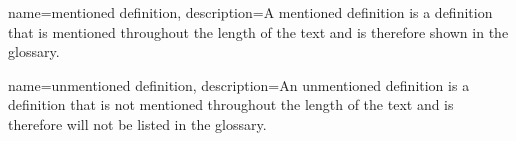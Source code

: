 {
  name={mentioned definition},
  description={A mentioned definition is a definition that is mentioned throughout the length of the text and is therefore shown in the glossary.}
}

{
  name={unmentioned definition},
  description={An unmentioned definition is a definition that is not mentioned throughout the length of the text and is therefore will not be listed in the glossary.}
}